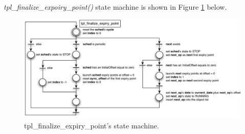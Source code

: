 \textit{tpl\_finalize\_expoiry\_point()} state machine is shown in Figure \ref{fig:STprocessingTplFinalize} below.

\begin{figure}[H] %
   \centering
   \includegraphics[width=7in]{pictures/STprocessingTplFinalize.pdf}  
   \caption{tpl_finalize_expiry_point's state machine.}
   \label{fig:STprocessingTplFinalize}
\end{figure} 
















